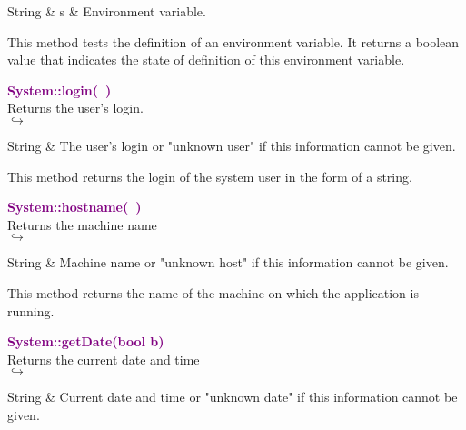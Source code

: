 \begin{tcolorbox}[width=\textwidth,myArgs,tabularx={ll|R}]
String & s & Environment variable.
\end{tcolorbox}

This method tests the definition of an environment variable. It returns a boolean value that indicates the state of definition of this environment variable.

\textcolor{purple}{\textbf{System::login(~)}}\label{System::login()}\\
Returns the user's login.\\ \hspace*{5mm}$\hookrightarrow$
\vspace*{-2em}\begin{tcolorbox}[grow to left by=-1cm, width=\textwidth-1cm,myArgs,tabularx={l|R}]
String & The user's login or "unknown user" if this information cannot be given.
\end{tcolorbox}

This method returns the login of the system user in the form of a string.

\textcolor{purple}{\textbf{System::hostname(~)}}\label{System::hostname()}\\
Returns the machine name\\ \hspace*{5mm}$\hookrightarrow$
\vspace*{-2em}\begin{tcolorbox}[grow to left by=-1cm, width=\textwidth-1cm,myArgs,tabularx={l|R}]
String & Machine name or "unknown host" if this information cannot be given.
\end{tcolorbox}

This method returns the name of the machine on which the application is running.

\textcolor{purple}{\textbf{System::getDate(bool b)}}\label{System::getDate(bool b)}\\
Returns the current date and time\\ \hspace*{5mm}$\hookrightarrow$
\vspace*{-2em}\begin{tcolorbox}[grow to left by=-1cm, width=\textwidth-1cm,myArgs,tabularx={l|R}]
String & Current date and time or "unknown date" if this information cannot be given.
\end{tcolorbox}

